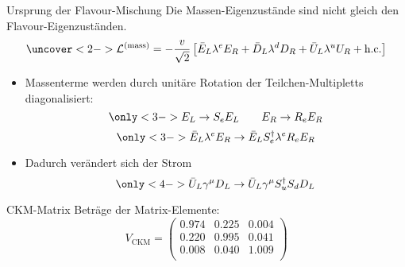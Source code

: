\begin{frame}{Ursprung der Flavour-Mischung}
Die Massen-Eigenzustände sind nicht gleich den Flavour-Eigenzuständen.
\[ \uncover<2->{\mathcal{L}^{(\text{mass})} = -\frac{v}{\sqrt{2}}\left[ \bar{E}_L\lambda^e E_R  + \bar{D}_L \lambda^dD_R + \bar{U}_L\lambda^u U_R + \text{h.c.}\right]} \]
\begin{itemize}
	\item<3-> Massenterme werden durch unitäre Rotation der Teilchen-Multipletts diagonalisiert: \[ \only<3->{E_L \rightarrow S_eE_L \qquad E_R \rightarrow R_eE_R} \]
	\[ \only<3->{\bar{E}_L\lambda^e E_R \rightarrow \bar{E}_LS_e^\dagger\lambda^eR_e E_R} \]
	\item<4-> Dadurch verändert sich der Strom
	\[ \only<4->{\bar{U}_L\gamma^\mu D_L \rightarrow \bar{U}_L\gamma^\mu S_u^\dagger S_dD_L} \]
\end{itemize}
\end{frame}
\begin{frame}{CKM-Matrix}
Beträge der Matrix-Elemente: \[ V_\text{CKM} = \begin{pmatrix}
	0.974 & 0.225 & 0.004 \\
	0.220 & 0.995 & 0.041 \\
	0.008 & 0.040 & 1.009 \\
\end{pmatrix} \]
\end{frame}